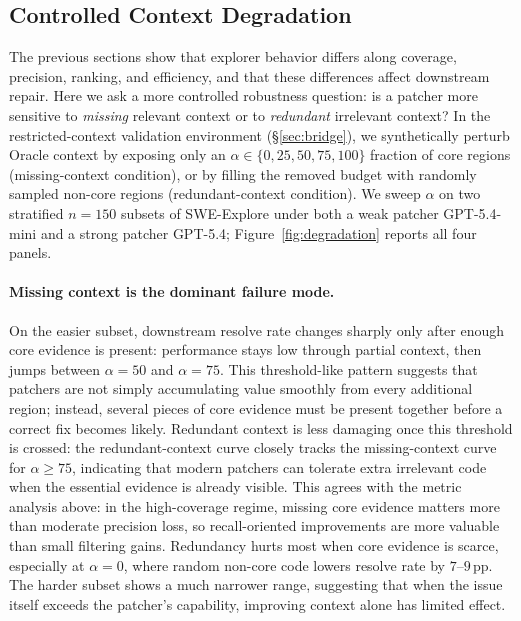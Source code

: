 \documentclass{llmxive}
\begin{document}
\subsection{Controlled Context Degradation}
\label{sec:degradation}
\vspace{-1mm}
The previous sections show that explorer behavior differs along coverage, precision, ranking, and efficiency, and that these differences affect downstream repair. Here we ask a more controlled robustness question: is a patcher more sensitive to \emph{missing} relevant context or to \emph{redundant} irrelevant context? In the restricted-context validation environment (\S\ref{sec:bridge}), we synthetically perturb Oracle context by exposing only an $\alpha\in\{0,25,50,75,100\}$ fraction of core regions (missing-context condition), or by filling the removed budget with randomly sampled non-core regions (redundant-context condition). We sweep $\alpha$ on two stratified $n{=}150$ subsets of SWE-Explore under both a weak patcher GPT-5.4-mini and a strong patcher GPT-5.4; Figure~\ref{fig:degradation} reports all four panels.


\vspace{-3mm}
\paragraph{Missing context is the dominant failure mode.}
On the easier subset, downstream resolve rate changes sharply only after enough core evidence is present: performance stays low through partial context, then jumps between $\alpha{=}50$ and $\alpha{=}75$. This threshold-like pattern suggests that patchers are not simply accumulating value smoothly from every additional region; instead, several pieces of core evidence must be present together before a correct fix becomes likely. Redundant context is less damaging once this threshold is crossed: the redundant-context curve closely tracks the missing-context curve for $\alpha\geq75$, indicating that modern patchers can tolerate extra irrelevant code when the essential evidence is already visible. This agrees with the metric analysis above: in the high-coverage regime, missing core evidence matters more than moderate precision loss, so recall-oriented improvements are more valuable than small filtering gains. Redundancy hurts most when core evidence is scarce, especially at $\alpha{=}0$, where random non-core code lowers resolve rate by $7$--$9$\,pp. The harder subset shows a much narrower range, suggesting that when the issue itself exceeds the patcher's capability, improving context alone has limited effect.
\end{document}
